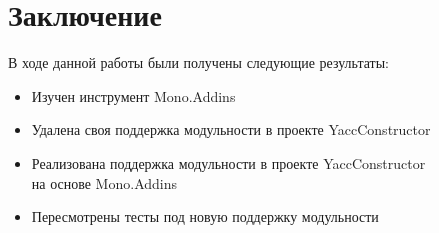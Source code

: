 \documentclass{matmex-diploma}
\begin{document}
\section*{Заключение}
В ходе данной работы были получены следующие результаты:
\begin{itemize}
\item Изучен инструмент Mono.Addins
\item Удалена своя поддержка модульности в проекте  YaccConstructor
\item Реализована поддержка модульности в проекте YaccConstructor \\на основе Mono.Addins
\item Пересмотрены тесты под новую поддержку модульности
\end{itemize}





\end{document}
